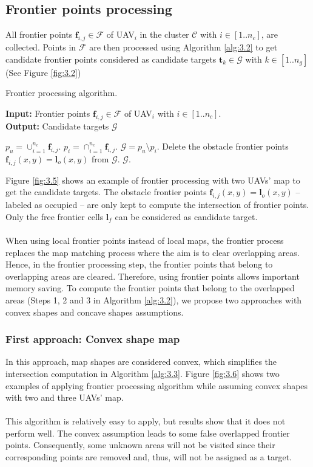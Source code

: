 \documentclass[11pt,openany]{book}
\begin{document}
\subsection{Frontier points processing}
All frontier points $\mathbf{f}_{i,j} \in \mathcal{F}$ of UAV$_i$ in the cluster $\mathcal{C}$ with $i \in [1..n_c]$, are collected. Points in $\mathcal{F}$ are then processed using Algorithm \ref{alg:3.2} to get candidate frontier points considered as candidate targets $\mathbf{t}_k \in \mathcal{G}$ with $k \in [1..n_g]$ (See Figure \ref{fig:3.2})
\begin{algorithm}[H]
    \caption{Frontier processing algorithm.}
    \label{alg:3.2}
    \hspace*{\algorithmicindent} \textbf{Input:} Frontier points $\mathbf{f}_{i,j} \in \mathcal{F}$ of UAV$_i$ with $i \in [1..n_c]$. \\
    \hspace*{\algorithmicindent} \textbf{Output:} Candidate targets $\mathcal{G}$
    \begin{algorithmic}[1]
        \STATE $p_u=\cup_{i=1}^{n_c}\mathbf{f}_{i,j}$.
        \STATE $p_i=\cap_{i=1}^{n_c}\mathbf{f}_{i,j}$.
        \STATE $\mathcal{G}=p_u\setminus p_i$.
        \STATE Delete the obstacle frontier points $\mathbf{f}_{i,j}(x,y)=\mathbf{l}_o(x,y)$ from $\mathcal{G}$.
        \RETURN $\mathcal{G}$.
    \end{algorithmic}
\end{algorithm}
Figure \ref{fig:3.5} shows an example of frontier processing with two UAVs’ map to get the candidate targets. The obstacle frontier points $\mathbf{f}_{i,j}(x,y)=\mathbf{l}_o(x,y)$ – labeled as occupied – are only kept to compute the intersection of frontier points. Only the free frontier cells $\mathbf{l}_f$ can be considered as candidate target.\\\\
When using local frontier points instead of local maps, the frontier process replaces the map matching process where the aim is to clear overlapping areas. Hence, in the frontier processing step, the frontier points that belong to overlapping areas are cleared. Therefore, using frontier points allows important memory saving. To compute the frontier points that belong to the overlapped areas (Steps 1, 2 and 3 in Algorithm \ref{alg:3.2}), we propose two approaches with convex shapes and concave shapes assumptions.
\subsubsection{First approach: Convex shape map}
In this approach, map shapes are considered convex, which simplifies the intersection computation in Algorithm \ref{alg:3.3}. Figure \ref{fig:3.6} shows two examples of applying frontier processing algorithm while assuming convex shapes with two and three UAVs’ map.\\\\
This algorithm is relatively easy to apply, but results show that it does not perform well. The convex assumption leads to some false overlapped frontier points. Consequently, some unknown areas will not be visited since their corresponding points are removed and, thus, will not be assigned as a target.
\end{document}
